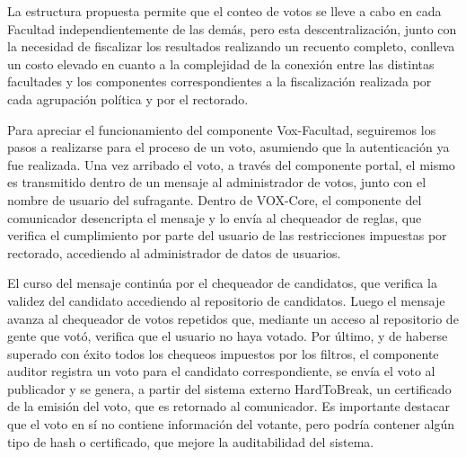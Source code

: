 La estructura propuesta permite que el conteo de votos se lleve a cabo en cada Facultad independientemente de las demás, pero esta descentralización, junto con la necesidad de fiscalizar los resultados realizando un recuento completo, conlleva un costo elevado en cuanto a la complejidad de la conexión entre las distintas facultades y los componentes correspondientes a la fiscalización realizada por cada agrupación política y por el rectorado.


Para apreciar el funcionamiento del componente Vox-Facultad, seguiremos los pasos a realizarse para el proceso de un voto, asumiendo que la autenticación ya fue realizada. Una vez arribado el voto, a través del componente portal, el mismo es transmitido dentro de un mensaje al administrador de votos, junto con el nombre de usuario del sufragante. Dentro de VOX-Core, el componente del comunicador desencripta el mensaje y lo envía al chequeador de reglas, que verifica el cumplimiento por parte del usuario de las restricciones impuestas por rectorado, accediendo al administrador de datos de usuarios. %


El curso del mensaje continúa por el chequeador de candidatos, que verifica la validez del candidato accediendo al repositorio de candidatos.
Luego el mensaje avanza al chequeador de votos repetidos que, mediante un acceso al repositorio de gente que votó, verifica que el usuario no haya votado.
Por último, y de haberse superado con éxito todos los chequeos impuestos por los filtros, el componente auditor registra un voto para el candidato correspondiente, se envía el voto al publicador y se genera, a partir del sistema externo HardToBreak, un certificado de la emisión del voto, que es retornado al comunicador. Es importante destacar que el voto en sí no contiene información del votante, pero podría contener algún tipo de hash o certificado, que mejore la auditabilidad del sistema. 
 
